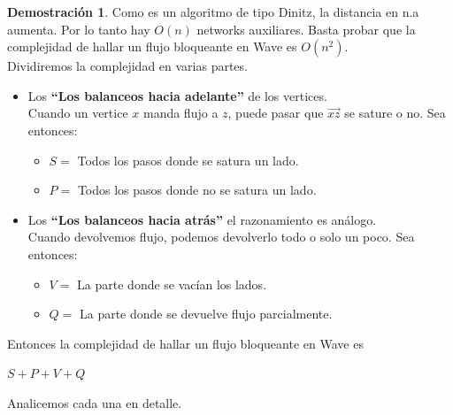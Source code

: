 \documentclass[11pt, a4paper]{article}
\theoremstyle{definition}
\newtheorem*{demostracion}{Demostración}
\begin{document}
\begin{demostracion}
    Como es un algoritmo de tipo Dinitz, la distancia en n.a aumenta. Por lo tanto hay $O(n)$ networks auxiliares. Basta probar que la complejidad de 
    hallar un flujo bloqueante en Wave es $O(n^2)$.\\
    Dividiremos la complejidad en varias partes. 

    \begin{itemize}
        \item Los \textbf{“Los balanceos hacia adelante”} de los vertices.\\
                Cuando un vertice $x$ manda flujo a $z$, puede pasar que $\overrightarrow{xz}$ se sature o no. Sea entonces:
                \begin{itemize}
                    \item $S=$ Todos los pasos donde se satura un lado.
                    \item $P=$ Todos los pasos donde no se satura un lado.
                \end{itemize}
        \item Los \textbf{“Los balanceos hacia atrás”} el razonamiento es análogo.\\
                Cuando devolvemos flujo, podemos devolverlo todo o solo un poco. Sea entonces:
                \begin{itemize}
                    \item $V=$ La parte donde se vacían los lados.
                    \item $Q=$ La parte donde se devuelve flujo parcialmente.
                \end{itemize}
    \end{itemize}
    Entonces la complejidad de hallar un flujo bloqueante en Wave es 
    \begin{center}
        $S+P+V+Q$
    \end{center} 
    Analicemos cada una en detalle.


\end{demostracion}
\end{document}
